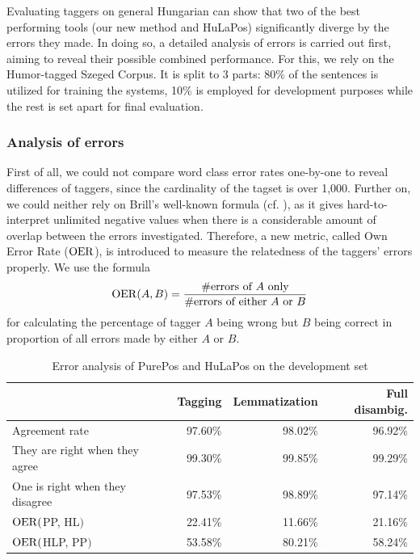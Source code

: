 Evaluating taggers on general Hungarian can show that two of the best performing tools (our new method and HuLaPos) significantly diverge by the errors they made.
In doing so, a detailed analysis of errors is carried out first, aiming to reveal their possible combined performance.
For this, we rely on the Humor-tagged Szeged Corpus.
It is split to 3 parts: 80\% of the sentences is utilized for training the systems, 10\% is employed for development purposes while the rest is set apart for final evaluation.

\subsubsection{Analysis of errors}

First of all, we could not compare word class error rates one-by-one to reveal differences of taggers, since the cardinality of the tagset is over 1,000.
Further on, we could neither rely on Brill's well-known formula (cf. \cite{Brill1998}), as it gives hard-to-interpret unlimited negative values when there is a considerable amount of overlap between the errors investigated.
Therefore, a new metric, called Own Error Rate ($\operatorname{OER}$), is introduced to measure the relatedness of the taggers' errors properly.
We use the formula 
\begin{equation}
\operatorname{OER}(A,B)=\frac{\text{\#errors of }A\text{ only}}{\text{\#errors of either }A\text{ or }B}
\end{equation}
for calculating the percentage of tagger $A$ being wrong but $B$ being correct in proportion of all errors made by either $A$ or $B$.

\begin{table}[H]
\centering
\caption{Error analysis of PurePos and HuLaPos on the development set}\label{tab:comb-disambig-comp}
\begin{tabular}{l r r r}
\hline
& Tagging & Lemmatization & Full disambig. \\
\hline

Agreement rate & 97.60\% & 98.02\% & 96.92\% \\
They are right when they agree & 99.30\% & 99.85\% & 99.29\% \\
One is right when they disagree & 97.53\% & 98.89\% & 97.14\% \\
$\operatorname{OER}($PP, HL$)$ & 22.41\% & 11.66\% & 21.16\% \\
$\operatorname{OER}($HLP, PP$)$ & 53.58\% & 80.21\% & 58.24\% \\
\hline
\end{tabular}
\end{table}

